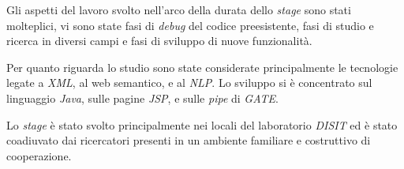 \documentclass[11pt,a4paper]{article}
\begin{document}
Gli aspetti del lavoro svolto nell'arco della durata dello \emph{stage} sono stati
molteplici, vi sono state fasi di \emph{debug} del
codice preesistente, fasi di studio e ricerca in diversi campi  e
fasi di sviluppo di nuove funzionalit\`a.

Per quanto riguarda lo studio sono state considerate principalmente le
tecnologie legate a \emph{XML}, al web semantico, e al \emph{NLP}. Lo sviluppo si
\`e concentrato sul linguaggio \emph{Java}, sulle pagine \emph{JSP}, e
sulle \emph{pipe} di \emph{GATE}.

Lo \emph{stage} \`e stato svolto principalmente nei locali del
laboratorio \emph{DISIT} ed \`e stato coadiuvato dai ricercatori
presenti in un ambiente familiare e costruttivo di cooperazione.
\end{document}
